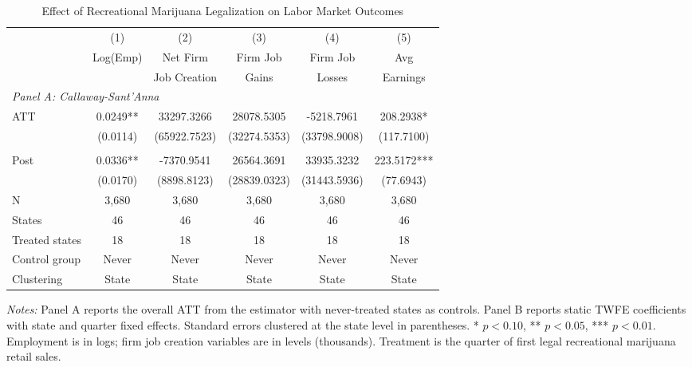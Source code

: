 \begin{table}[H]
\centering
\caption{Effect of Recreational Marijuana Legalization on Labor Market Outcomes}
\begin{threeparttable}
\begin{adjustbox}{max width=\textwidth}
\begin{tabular}{lccccc}
\toprule
 & (1) & (2) & (3) & (4) & (5) \\
 & Log(Emp) & Net Firm & Firm Job & Firm Job & Avg \\
 &  & Job Creation & Gains & Losses & Earnings \\
\midrule
\multicolumn{6}{l}{\textit{Panel A: Callaway-Sant'Anna}} \\
\addlinespace
ATT & 0.0249** & 33297.3266 & 28078.5305 & -5218.7961 & 208.2938* \\
 & (0.0114) & (65922.7523) & (32274.5353) & (33798.9008) & (117.7100) \\
\addlinespace
\multicolumn{6}{l}{\textit{Panel B: TWFE}} \\
\addlinespace
Post & 0.0336** & -7370.9541 & 26564.3691 & 33935.3232 & 223.5172*** \\
 & (0.0170) & (8898.8123) & (28839.0323) & (31443.5936) & (77.6943) \\
\midrule
N & 3,680 & 3,680 & 3,680 & 3,680 & 3,680 \\
States & 46 & 46 & 46 & 46 & 46 \\
Treated states & 18 & 18 & 18 & 18 & 18 \\
Control group & Never & Never & Never & Never & Never \\
Clustering & State & State & State & State & State \\
\bottomrule
\end{tabular}
\end{adjustbox}
\begin{tablenotes}[flushleft]
\small
\item \textit{Notes:} Panel A reports the overall ATT from the \citet{callaway2021} estimator with never-treated states as controls. Panel B reports static TWFE coefficients with state and quarter fixed effects. Standard errors clustered at the state level in parentheses. * $p<0.10$, ** $p<0.05$, *** $p<0.01$. Employment is in logs; firm job creation variables are in levels (thousands). Treatment is the quarter of first legal recreational marijuana retail sales.
\end{tablenotes}
\end{threeparttable}
\label{tab:main}
\end{table}

